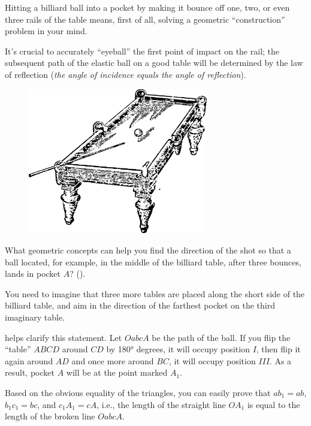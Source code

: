 Hitting a billiard ball into a pocket by making it bounce off one, two, or even three rails of the table means, first of all, solving a geometric ``construction'' problem in your mind.

It's crucial to accurately ``eyeball'' the first point of impact on the rail; the subsequent path of the elastic ball on a good table will be determined by the law of reflection (\emph{the angle of incidence equals the angle of reflection}).



\begin{figure}[h!]
\centering
\includegraphics[width=0.7\textwidth]{figures/ch-10/fig-150.pdf}
\end{figure}




\ques What geometric concepts can help you find the direction of the shot so that a ball located, for example, in the middle of the billiard table, after three bounces, lands in pocket $A$? ().


\ans You need to imagine that three more tables are placed along the short side of the billiard table, and aim in the direction of the farthest pocket on the third imaginary table.

 helps clarify this statement. Let \( OabcA \) be the path of the ball. If you flip the ``table'' $ABCD$ around $CD$ by \ang{180} degrees, it will occupy position $I$, then flip it again around $AD$ and once more around $BC$, it will occupy position $III$. As a result, pocket $A$ will be at the point marked $A_{1}$.

Based on the obvious equality of the triangles, you can easily prove that \( ab_{1} = ab \), \( b_{1}c_{1} = bc \), and \( c_{1}A_{1} = cA \), i.e., the length of the straight line \( OA_{1} \) is equal to the length of the broken line \( OabcA \).


